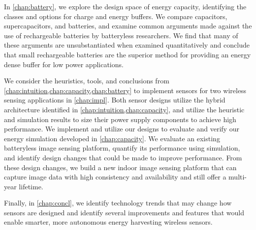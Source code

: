 In \cref{chap:battery}, we explore the design space of energy capacity, identifying the classes and options for charge and energy buffers. We compare capacitors, supercapacitors, and batteries, and examine common arguments made against the use of rechargeable batteries by batteryless researchers.
We find that many of these arguments are unsubstantiated when examined quantitatively and conclude that small rechargeable batteries are the superior method for providing an energy dense buffer for low power applications.

We consider the heuristics, tools, and conclusions from \cref{chap:intuition,chap:capacity,chap:battery} to implement sensors for two wireless sensing applications in \cref{chap:impl}. Both sensor designs utilize the hybrid architecture identified in \cref{chap:intuition,chap:capacity}, and utilize the heuristic and simulation results to size their power supply components to achieve high performance. 
We implement and utilize our designs to evaluate and verify our energy simulation developed in \cref{chap:capacity}. 
We evaluate an existing batteryless image sensing platform, quantify its performance using simulation, and identify design changes that could be made to improve performance.
From these design changes, we build a new indoor image sensing platform that can capture image data with high consistency and availability and still offer a multi-year lifetime. 

Finally, in \cref{chap:concl}, we identify technology trends that may change how sensors are designed and identify several improvements and features that would enable smarter, more autonomous energy harvesting wireless sensors. 

